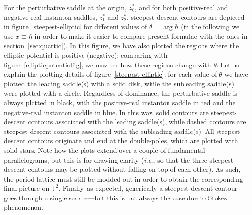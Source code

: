 \documentclass[11pt,a4paper]{article}
\def\BT{{\mathbb T}}
\begin{document}
For the perturbative saddle at the origin, $z^*_0$, and for both positive-real and negative-real instanton saddles, $z^*_1$ and $z^*_2$, steepest-descent contours are depicted in figure~\ref{steepest-elliptic} for different values of $\theta = \arg \hbar$ (in the following we use $x \equiv \hbar$ in order to make it easier to compare present formulae with the ones in section~\ref{sec:quartic}). In this figure, we have also plotted the regions where the elliptic potential is positive (negative): comparing with figure~\ref{ellipticpotentialfig}, we now see how these regions change with $\theta$. Let us explain the plotting details of figure~\ref{steepest-elliptic}: for each value of $\theta$ we have plotted the leading saddle(s) with a solid disk, while the subleading saddle(s) were plotted with a circle. Regardless of dominance, the perturbative saddle is always plotted in black, with the positive-real instanton saddle in red and the negative-real instanton saddle in blue. In this way, solid contours are steepest-descent contours associated with the leading saddle(s), while dashed contours are steepest-descent contours associated with the subleading saddle(s). All steepest-descent contours originate and end at the double-poles, which are plotted with solid stars. Note how the plots extend over a couple of fundamental parallelograms, but this is for drawing clarity (\textit{i.e.}, so that the three steepest-descent contours may be plotted without falling on top of each other). As such, the period lattice must still be modded-out in order to obtain the corresponding final picture on $\BT^2$. Finally, as expected, generically a steepest-descent contour goes through a single saddle---but this is not always the case due to Stokes phenomenon.
\end{document}
